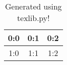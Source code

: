\documentclass{article}
\begin{document}
\begin{table}[h!]
\centering
\begin{tabular}{|c|c|c|}
\hline
0:0 & 0:1 & 0:2 \\
\hline
1:0 & 1:1 & 1:2 \\
\hline
\end{tabular}
\caption{Generated using texlib.py!}
\end{table}
\end{document}
